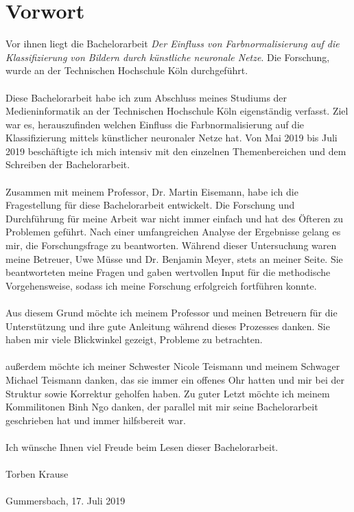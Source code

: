 \documentclass[a4paper,12pt,oneside]{article}
\begin{document}
  \newpage
  \section*{Vorwort}
Vor ihnen liegt die Bachelorarbeit \textit{Der Einfluss von Farbnormalisierung auf die Klassifizierung von Bildern durch künstliche neuronale Netze}. Die Forschung, wurde an der Technischen Hochschule Köln durchgeführt.\\\\
Diese Bachelorarbeit habe ich zum Abschluss meines Studiums der Medieninformatik an der Technischen Hochschule Köln eigenständig verfasst. Ziel war es, herauszufinden welchen Einfluss die Farbnormalisierung auf die Klassifizierung mittels künstlicher neuronaler Netze hat. Von Mai 2019 bis Juli 2019 beschäftigte ich mich intensiv mit den einzelnen Themenbereichen und dem Schreiben der Bachelorarbeit.\\\\
Zusammen mit meinem Professor, Dr. Martin Eisemann, habe ich die Fragestellung für diese Bachelorarbeit entwickelt. Die Forschung und Durchführung für meine Arbeit war nicht immer einfach und hat des Öfteren zu Problemen geführt. Nach einer umfangreichen Analyse der Ergebnisse gelang es mir, die Forschungsfrage zu beantworten. Während dieser Untersuchung waren meine Betreuer, Uwe Müsse und Dr. Benjamin Meyer, stets an meiner Seite. Sie beantworteten meine Fragen und gaben wertvollen Input für die methodische Vorgehensweise, sodass ich meine Forschung erfolgreich fortführen konnte.\\\\
Aus diesem Grund möchte ich meinem Professor und meinen Betreuern für die Unterstützung und ihre gute Anleitung während dieses Prozesses danken. Sie haben mir viele Blickwinkel gezeigt, Probleme zu betrachten.\\\\
außerdem möchte ich meiner Schwester Nicole Teismann und meinem Schwager Michael Teismann danken, das sie immer ein offenes Ohr hatten und mir bei der Struktur sowie Korrektur geholfen haben. Zu guter Letzt möchte ich meinem Kommilitonen Binh Ngo danken, der parallel mit mir seine Bachelorarbeit geschrieben hat und immer hilfsbereit war.\\\\
Ich wünsche Ihnen viel Freude beim Lesen dieser Bachelorarbeit.\\\\
Torben Krause\\\\
Gummersbach, 17. Juli 2019
\newpage
\end{document}
